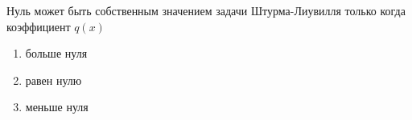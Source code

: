 Нуль может быть собственным значением задачи Штурма-Лиувилля только когда коэффициент \(q(x)\)

\begin{enumerate}[label=\arabic*)]
    \item больше нуля
    \item равен нулю
    \item меньше нуля
\end{enumerate}

